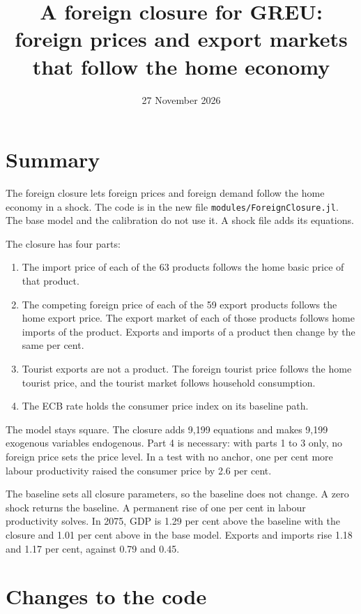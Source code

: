 \documentclass[11pt,a4paper]{article}
\title{A foreign closure for GREU:\\ foreign prices and export markets that follow the home economy}
\author{}
\date{27 November 2026}
\newcommand{\code}[1]{\texttt{#1}}
\begin{document}
\maketitle

\section{Summary}

The foreign closure lets foreign prices and foreign demand follow the home economy in a shock.
The code is in the new file \code{modules/ForeignClosure.jl}. The base model and the calibration do not use it. A shock file adds its equations.

The closure has four parts:
\begin{enumerate}
\item The import price of each of the 63 products follows the home basic price of that product.
\item The competing foreign price of each of the 59 export products follows the home export price. The export market of each of those products follows home imports of the product. Exports and imports of a product then change by the same per cent.
\item Tourist exports are not a product. The foreign tourist price follows the home tourist price, and the tourist market follows household consumption.
\item The ECB rate holds the consumer price index on its baseline path.
\end{enumerate}

The model stays square. The closure adds 9{,}199 equations and makes 9{,}199 exogenous variables endogenous.
Part 4 is necessary: with parts 1 to 3 only, no foreign price sets the price level. In a test with no anchor, one per cent more labour productivity raised the consumer price by 2.6 per cent.

The baseline sets all closure parameters, so the baseline does not change. A zero shock returns the baseline.
A permanent rise of one per cent in labour productivity solves. In 2075, GDP is 1.29 per cent above the baseline with the closure and 1.01 per cent above in the base model. Exports and imports rise 1.18 and 1.17 per cent, against 0.79 and 0.45.

\section{Changes to the code}
\end{document}

